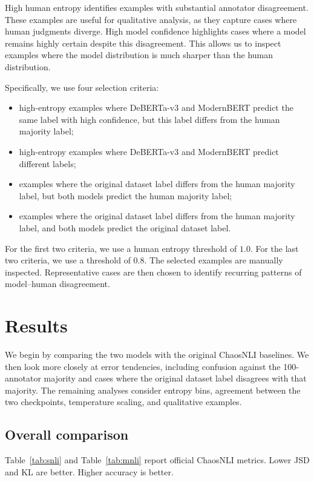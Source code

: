 \documentclass[11pt,a4paper]{article}
\begin{document}
High human entropy identifies examples with substantial annotator disagreement. These examples are useful for qualitative analysis, as they capture cases where human judgments diverge. High model confidence highlights cases where a model remains highly certain despite this disagreement. This allows us to inspect examples where the model distribution is much sharper than the human distribution.

Specifically, we use four selection criteria:

\begin{itemize}[itemsep=0.4em, topsep=0.4em]
\item high-entropy examples where DeBERTa-v3 and ModernBERT predict the same label with high confidence, but this label differs from the human majority label;
\item high-entropy examples where DeBERTa-v3 and ModernBERT predict different labels;
\item examples where the original dataset label differs from the human majority label, but both models predict the human majority label;
\item examples where the original dataset label differs from the human majority label, and both models predict the original dataset label.
\end{itemize}

For the first two criteria, we use a human entropy threshold of $1.0$. For the last two criteria, we use a threshold of $0.8$. The selected examples are manually inspected. Representative cases are then chosen to identify recurring patterns of model--human disagreement.

\section{Results}

We begin by comparing the two models with the original ChaosNLI baselines. We then look more closely at error tendencies, including confusion against the 100-annotator majority and cases where the original dataset label disagrees with that majority. The remaining analyses consider entropy bins, agreement between the two checkpoints, temperature scaling, and qualitative examples.

\subsection{Overall comparison}

Table~\ref{tab:snli} and Table~\ref{tab:mnli} report official ChaosNLI metrics. Lower JSD and KL are better. Higher accuracy is better.
\end{document}
